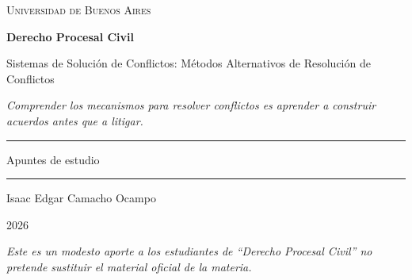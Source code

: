\documentclass[12pt,oneside]{book}
\newcommand{\universidad}{Universidad de Buenos Aires}
\newcommand{\materia}{Derecho Procesal Civil}
\newcommand{\titulo}{Sistemas de Solución de Conflictos: Métodos Alternativos de Resolución de Conflictos}
\newcommand{\autor}{Isaac Edgar Camacho Ocampo}
\newcommand{\anio}{2026}
\begin{document}
\begin{titlepage}

\thispagestyle{empty}

\begin{center}

\vspace*{1cm}

{\large \textsc{\universidad}}

\vspace{3cm}

{\Huge \textbf{\materia}}

\vspace{1cm}

{\LARGE \linespread{1.3}\selectfont \titulo\par}

\vspace{0.8cm}

\textit{Comprender los mecanismos para resolver conflictos es aprender a construir acuerdos antes que a litigar.}

\vspace{1.2cm}

\rule{0.70\textwidth}{0.5pt}

\vspace{0.5cm}

{\large Apuntes de estudio}

\vspace{0.5cm}

\rule{0.70\textwidth}{0.5pt}

\vfill

{\large \autor}

\vspace{0.3cm}

{\large \anio}

\end{center}

\vfill

\begin{flushleft}
\textit{Este es un modesto aporte a los estudiantes de ``Derecho Procesal Civil'' no pretende sustituir el material oficial de la materia.}
\end{flushleft}

\end{titlepage}

\end{document}
